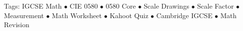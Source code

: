 \documentclass[11pt,a4paper]{article}
\begin{document}
\vspace{14pt}
\begin{center}
  \sffamily\scriptsize\textcolor{textmuted}{
    Tags: IGCSE Math $\bullet$ CIE 0580 $\bullet$ 0580 Core $\bullet$ Scale Drawings $\bullet$ Scale Factor $\bullet$ Measurement $\bullet$ Math Worksheet $\bullet$ Kahoot Quiz $\bullet$ Cambridge IGCSE $\bullet$ Math Revision
  }
\end{center}
\end{document}
